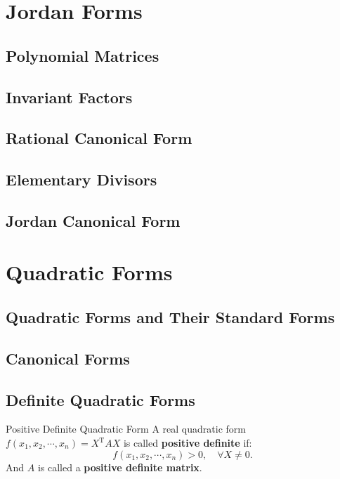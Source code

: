 \documentclass[11pt]{../../TexTemplate/elegantbook} %
\begin{document}
\chapter{Jordan Forms}
\section{Polynomial Matrices}

\section{Invariant Factors}

\section{Rational Canonical Form}

\section{Elementary Divisors}

\section{Jordan Canonical Form}

\chapter{Quadratic Forms}
\section{Quadratic Forms and Their Standard Forms}
\section{Canonical Forms}
\section{Definite Quadratic Forms}
\begin{definition}{Positive Definite Quadratic Form}
    A real quadratic form \( f( x_{1}, x_{2}, \cdots, x_{n})=X^{\mathrm{T}}AX \) is called \textbf{positive definite} if:
    \[
    f( x_{1}, x_{2}, \cdots, x_{n}) > 0, \quad \forall X \neq 0.
    \]
    And \( A \) is called a \textbf{positive definite matrix}.
\end{definition}
\end{document}
